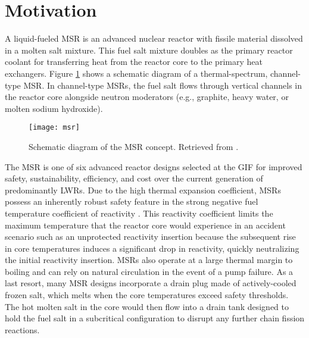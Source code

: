 \section{Motivation}

A liquid-fueled \gls{MSR} is an advanced nuclear reactor with fissile material
dissolved in a molten salt mixture. This fuel salt mixture doubles as the primary reactor coolant
for transferring heat from the reactor core to the primary heat exchangers. Figure \ref{fig:msr}
shows a schematic diagram of a thermal-spectrum, channel-type \gls{MSR}. In channel-type
\glspl{MSR}, the fuel salt flows through vertical channels in the reactor core alongside neutron
moderators (e.g., graphite, heavy water, or molten sodium hydroxide). 
%
\begin{figure}[htb!]
	\centering
	\texttt{[image: msr]}
	\caption{Schematic diagram of the \gls{MSR} concept. Retrieved from
	\cite{doe_technology_2002}.}
	\label{fig:msr}
\end{figure}

The \gls{MSR} is one of six advanced reactor designs selected at the \gls{GIF} for improved safety,
sustainability, efficiency, and cost over the current generation of predominantly \glspl{LWR}.
Due to the high thermal expansion coefficient, \glspl{MSR} possess an inherently robust
safety feature in the strong negative fuel temperature coefficient of
reactivity \cite{elsheikh_safety_2013}. This reactivity coefficient limits the
maximum temperature that the reactor core would experience in an accident
scenario such as an unprotected reactivity insertion because the subsequent
rise in core temperatures induces a significant drop in reactivity,
quickly neutralizing the initial reactivity insertion. \glspl{MSR} also
operate at a large thermal margin to boiling and can rely on natural
circulation in the event of a pump failure. As a last resort, many \gls{MSR}
designs incorporate a drain plug made of actively-cooled frozen salt, which
melts when the core temperatures exceed safety thresholds. The hot molten salt
in the core would then flow into a drain tank designed to hold the fuel salt in
a subcritical configuration to disrupt any further chain fission reactions.

